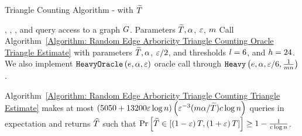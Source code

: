 \begin{algorithm}[ht!]
    \caption{Triangle Counting Algorithm - with $\widetilde{T}$}\label{Algorithm: Random Edge Arboricity Triangle Counting Triangle Estimate}
    \begin{algorithmic}[1]
        \Require \degreeq{}, \neighbourq{}, \edgeexistsq{}, and \randedgeq{} query access to a graph $G$. Parameters $\widetilde{T}, \alpha$, $\varepsilon$, $m$ 
        \State Call Algorithm~\ref{Algorithm: Random Edge Arboricity Triangle Counting Oracle Triangle Estimate} with parameters $\widetilde{T}, \alpha$, $\varepsilon/2$, and thresholds $l = 6$, and $h = 24$. We also implement $\texttt{HeavyOracle}\left({e,\alpha,\varepsilon}\right)$ oracle call through $\texttt{Heavy}\left({e,\alpha,\varepsilon/6,\frac{1}{mn}}\right)$. 
    \end{algorithmic}
\end{algorithm}

\begin{theorem}\label{Theorem: Triangle Estimate ALgo Works}
   Algorithm~\ref{Algorithm: Random Edge Arboricity Triangle Counting Triangle Estimate} makes at most
$\left({5050+13200\varepsilon\log n}\right)\left({\varepsilon^{-3} (m\alpha/\widetilde{T}) c\log n}\right)$ queries in expectation and returns $\widehat{T}$ such that 
$\Pr\left[{\widehat{T} \in \left[{\left({1-\varepsilon}\right)T,\left({1+\varepsilon}\right)T}\right]}\right] \geq 1 - \frac{1}{c\log n}$.
\end{theorem}

